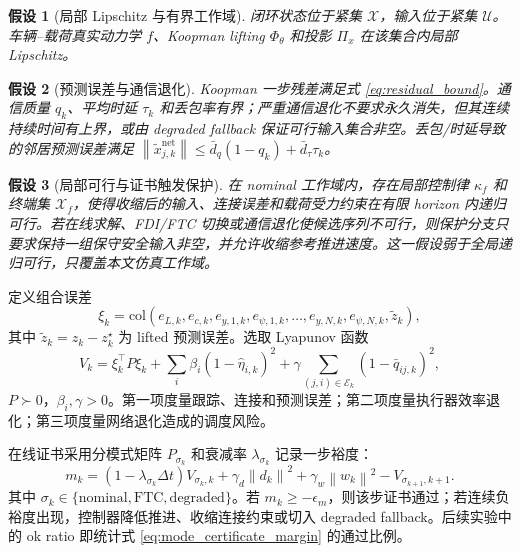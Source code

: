 \documentclass[twocolumn,3p,times,procedia]{elsarticle}
\newcommand{\norm}[1]{\left\lVert #1 \right\rVert}
\newtheorem{assumption}{假设}
\begin{document}
\begin{assumption}[局部 Lipschitz 与有界工作域]
闭环状态位于紧集 $\mathcal X$，输入位于紧集 $\mathcal U$。车辆--载荷真实动力学 $f$、Koopman lifting $\Phi_\theta$ 和投影 $\Pi_x$ 在该集合内局部 Lipschitz。
\end{assumption}

\begin{assumption}[预测误差与通信退化]
Koopman 一步残差满足式 \eqref{eq:residual_bound}。通信质量 $q_k$、平均时延 $\tau_k$ 和丢包率有界；严重通信退化不要求永久消失，但其连续持续时间有上界，或由 degraded fallback 保证可行输入集合非空。丢包/时延导致的邻居预测误差满足 $\norm{\tilde x_{j,k}^{\mathrm{net}}}\le \bar d_q(1-q_k)+\bar d_\tau \tau_k$。
\end{assumption}

\begin{assumption}[局部可行与证书触发保护]
在 nominal 工作域内，存在局部控制律 $\kappa_f$ 和终端集 $\mathcal X_f$，使得收缩后的输入、连接误差和载荷受力约束在有限 horizon 内递归可行。若在线求解、FDI/FTC 切换或通信退化使候选序列不可行，则保护分支只要求保持一组保守安全输入非空，并允许收缩参考推进速度。这一假设弱于全局递归可行，只覆盖本文仿真工作域。
\end{assumption}

定义组合误差
\begin{equation}
\xi_k=\mathrm{col}\left(e_{L,k},e_{c,k},e_{y,1,k},e_{\psi,1,k},\ldots,e_{y,N,k},e_{\psi,N,k},\tilde z_k\right),
\label{eq:xi_def}
\end{equation}
其中 $\tilde z_k=z_k-z_k^\star$ 为 lifted 预测误差。选取 Lyapunov 函数
\begin{equation}
V_k=\xi_k^\top P\xi_k+\sum_i \beta_i(1-\hat\eta_{i,k})^2+\gamma\sum_{(j,i)\in\mathcal E_k}(1-\bar q_{ij,k})^2 ,
\label{eq:lyapunov}
\end{equation}
$P\succ0$，$\beta_i,\gamma>0$。第一项度量跟踪、连接和预测误差；第二项度量执行器效率退化；第三项度量网络退化造成的调度风险。

在线证书采用分模式矩阵 $P_{\sigma_k}$ 和衰减率 $\lambda_{\sigma_k}$ 记录一步裕度：
\begin{equation}
m_k=(1-\lambda_{\sigma_k}\Delta t)V_{\sigma_k,k}
+\gamma_d\norm{d_k}^2+\gamma_w\norm{w_k}^2
-V_{\sigma_{k+1},k+1}.
\label{eq:mode_certificate_margin}
\end{equation}
其中 $\sigma_k\in\{\mathrm{nominal},\mathrm{FTC},\mathrm{degraded}\}$。若 $m_k\ge -\epsilon_m$，则该步证书通过；若连续负裕度出现，控制器降低推进、收缩连接约束或切入 degraded fallback。后续实验中的 ok ratio 即统计式 \eqref{eq:mode_certificate_margin} 的通过比例。
\end{document}
